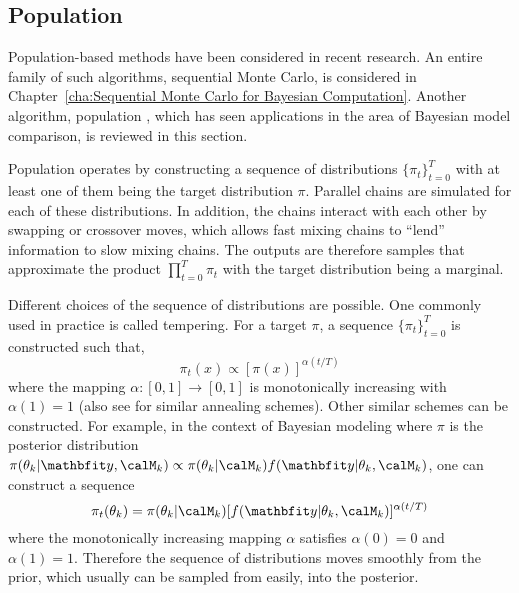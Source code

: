 \subsection{Population \protect\mcmc}
\label{sub:Population mcmc}

Population-based methods have been considered in recent research. An entire family of such algorithms, sequential Monte Carlo, is considered in Chapter~\ref{cha:Sequential Monte Carlo for Bayesian Computation}. Another algorithm, population \mcmc, which has seen applications in the area of Bayesian model comparison, is reviewed in this section.

Population \mcmc operates by constructing a sequence of distributions $\{\pi_t\}_{t=0}^T$ with at least one of them being the target distribution $\pi$. Parallel \mcmc chains are simulated for each of these distributions. In addition, the chains interact with each other by swapping or crossover moves, which allows fast mixing chains to ``lend'' information to slow mixing chains. The outputs are therefore samples that approximate the product $\prod_{t=0}^T\pi_t$ with the target distribution being a marginal.

Different choices of the sequence of distributions are possible. One commonly used in practice is called tempering. For a target $\pi$, a sequence $\{\pi_t\}_{t=0}^T$ is constructed such that,
\begin{equation}
  \pi_t(x) \propto [\pi(x)]^{\alpha(t/T)}
\end{equation}
where the mapping $\alpha:[0,1]\to[0,1]$ is monotonically increasing with $\alpha(1) = 1$ (also see \cite{Marinari:1992vx} for similar annealing schemes). Other similar schemes can be constructed. For example, in the context of Bayesian modeling where $\pi$ is the posterior distribution $\pi(\theta_k|\data,\calM_k) \propto \pi(\theta_k|\calM_k)f(\data|\theta_k,\calM_k)$, one can construct a sequence
\begin{equation}
  \pi_t(\theta_k) =
  \pi(\theta_k|\calM_k)[f(\data|\theta_k,\calM_k)]^{\alpha(t/T)}
  \label{eq:power post}
\end{equation}
where the monotonically increasing mapping $\alpha$ satisfies $\alpha(0) = 0$ and $\alpha(1) = 1$. Therefore the sequence of distributions moves smoothly from the prior, which usually can be sampled from easily, into the posterior.

